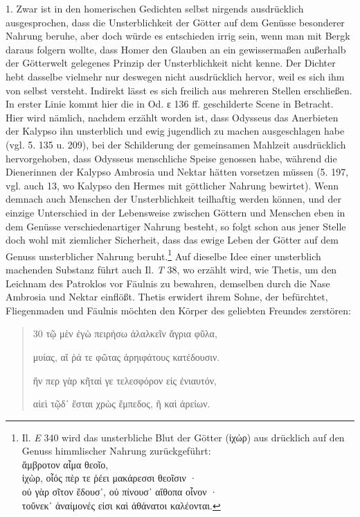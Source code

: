 \documentclass[a4paper, 11pt, oneside]{article}
\begin{document}
1. Zwar ist in den homerischen Gedichten selbst nirgends ausdrücklich ausgesprochen, dass die Unsterblichkeit der Götter auf dem Genüsse besonderer Nahrung beruhe, aber doch würde es entschieden irrig sein, wenn man mit Bergk daraus folgern wollte, dass Homer den Glauben an ein gewissermaßen außerhalb der Götterwelt gelegenes Prinzip der Unsterblichkeit nicht kenne. Der Dichter hebt dasselbe vielmehr nur deswegen nicht ausdrücklich hervor, weil es sich ihm von selbst versteht. Indirekt lässt es sich freilich aus mehreren Stellen erschließen. In erster Linie kommt hier die in Od. ε 136 ff. geschilderte Scene in Betracht. Hier wird nämlich, nachdem erzählt worden ist, dass Odysseus das Anerbieten der Kalypso ihn unsterblich und ewig jugendlich zu machen ausgeschlagen habe (vgl. 5. 135 u. 209), bei der Schilderung der gemeinsamen Mahlzeit ausdrücklich hervorgehoben, dass Odysseus menschliche Speise genossen habe, während die Dienerinnen der Kalypso Ambrosia und Nektar hätten vorsetzen müssen (5. 197, vgl. auch 13, wo Kalypso den Hermes mit göttlicher Nahrung bewirtet). Wenn demnach auch Menschen der Unsterblichkeit teilhaftig werden können, und der einzige Unterschied in der Lebensweise zwischen Göttern und Menschen eben in dem Genüsse verschiedenartiger Nahrung besteht, so folgt schon aus jener Stelle doch wohl mit ziemlicher Sicherheit, dass das ewige Leben der Götter auf dem Genuss unsterblicher Nahrung beruht.\footnote{Il. \emph{E} 340 wird das unsterbliche Blut der Götter (ἰχώρ) aus drücklich auf den Genuss himmlischer Nahrung zurückgeführt:\\\hspace*{15mm}ἄμβροτον αἷμα θεοῖο,\\\hspace*{5mm}ἰχὼρ, οἷός πὲρ τε ῥέει μακάρεσσι θεοῖσιν ·\\\hspace*{5mm}οὐ γὰρ σῖτον ἔδουσ᾽, οὐ πίνουσ᾽ αἴθοπα οἷνον ·\\\hspace*{5mm}τοὔνεκ᾽ ἀναίμονές εἰσι καὶ ἀθάνατοι καλέονται.} Auf dieselbe Idee einer unsterblich machenden Substanz führt auch Il. \emph{T} 38, wo erzählt wird, wie Thetis, um den Leichnam des Patroklos vor Fäulnis zu bewahren, demselben durch die Nase Ambrosia und Nektar einflößt. Thetis erwidert ihrem Sohne, der befürchtet, Fliegenmaden und Fäulnis möchten den Körper des geliebten Freundes zerstören:
\begin{quotation}
30 τῷ μὲν ἐγὼ πειρήσω ἀλαλκεῖν ἄγρια φῦλα,

μυίας, αἵ ῥά τε φῶτας ἀρηιφάτους κατέδουσιν.

ἤν περ γὰρ κῆταί γε τελεσφόρον εἰς ἐνιαυτόν,

αἰεὶ τῷδ᾽ ἔσται χρὼς ἔμπεδος, ἢ καὶ ἀρείων.
\end{quotation}
\end{document}
